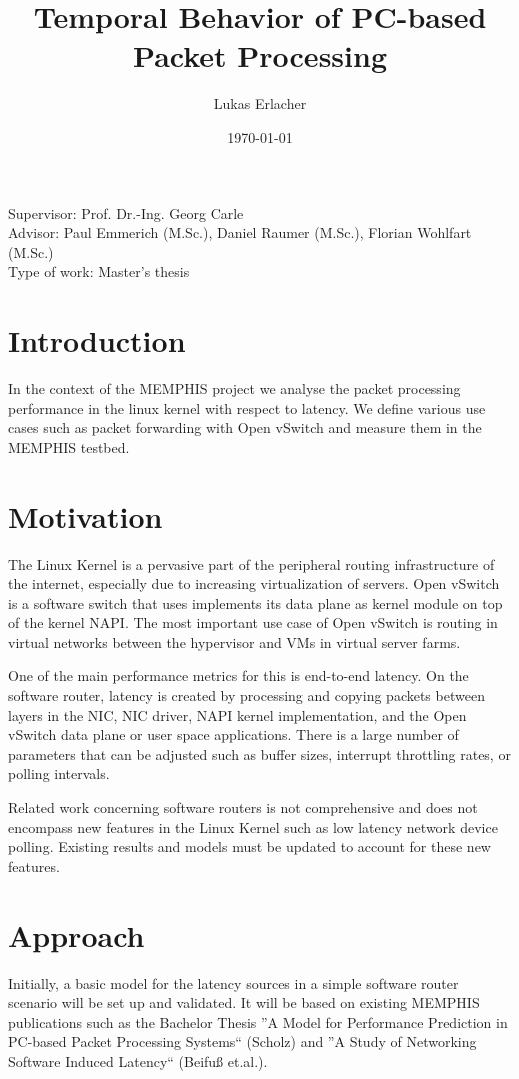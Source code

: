 \documentclass[a4paper]{article}
\title{Temporal Behavior of PC-based Packet Processing}
\date{\today}
\author{Lukas Erlacher}
\begin{document}
\maketitle
\thispagestyle{fancy}

\begin{flushleft}
Supervisor: Prof. Dr.-Ing. Georg Carle\\
Advisor: Paul Emmerich (M.Sc.), Daniel Raumer (M.Sc.), Florian Wohlfart (M.Sc.)\\
Type of work: Master's thesis
\end{flushleft}


\section*{Introduction}
In the context of the MEMPHIS project we analyse the packet processing performance in the linux kernel with respect to latency. We define various use cases such as packet forwarding with Open vSwitch and measure them in the MEMPHIS testbed.


\section*{Motivation}
The Linux Kernel is a pervasive part of the peripheral routing infrastructure of the internet, especially due to increasing virtualization of servers. Open vSwitch is a software switch that uses implements its data plane as kernel module on top of the kernel NAPI. The most important use case of Open vSwitch is routing in virtual networks between the hypervisor and VMs in virtual server farms.

One of the main performance metrics for this is end-to-end latency. On the software router, latency is created by processing and copying packets between layers in the NIC, NIC driver, NAPI kernel implementation, and the Open vSwitch data plane or user space applications. There is a large number of parameters that can be adjusted such as buffer sizes, interrupt throttling rates, or polling intervals.

Related work concerning software routers is not comprehensive and does not encompass new features in the Linux Kernel such as low latency network device polling. Existing results and models must be updated to account for these new features.

\section*{Approach}
Initially, a basic model for the latency sources in a simple software router scenario will be set up and validated. It will be based on existing MEMPHIS publications such as the Bachelor Thesis ''A Model for Performance Prediction in PC-based Packet Processing Systems`` (Scholz) and ''A Study of Networking Software Induced Latency`` (Beifuß et.al.).
\end{document}
